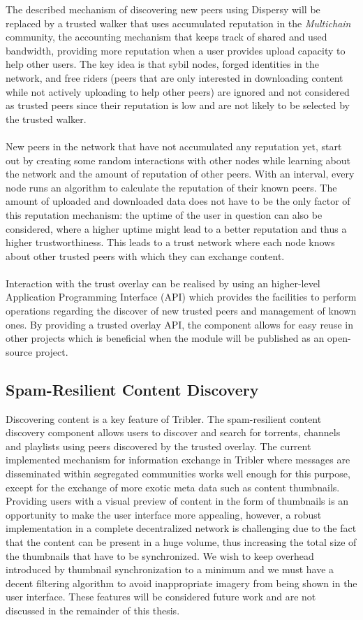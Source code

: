 The described mechanism of discovering new peers using Dispersy will be replaced by a trusted walker that uses accumulated reputation in the \emph{Multichain} community, the accounting mechanism that keeps track of shared and used bandwidth, providing more reputation when a user provides upload capacity to help other users. The key idea is that sybil nodes, forged identities in the network, and free riders (peers that are only interested in downloading content while not actively uploading to help other peers) are ignored and not considered as trusted peers since their reputation is low and are not likely to be selected by the trusted walker.\\\\
New peers in the network that have not accumulated any reputation yet, start out by creating some random interactions with other nodes while learning about the network and the amount of reputation of other peers. With an interval, every node runs an algorithm to calculate the reputation of their known peers. The amount of uploaded and downloaded data does not have to be the only factor of this reputation mechanism: the uptime of the user in question can also be considered, where a higher uptime might lead to a better reputation and thus a higher trustworthiness. This leads to a trust network where each node knows about other trusted peers with which they can exchange content.\\\\
Interaction with the trust overlay can be realised by using an higher-level Application Programming Interface (API) which provides the facilities to perform operations regarding the discover of new trusted peers and management of known ones. By providing a trusted overlay API, the component allows for easy reuse in other projects which is beneficial when the module will be published as an open-source project.

\subsection{Spam-Resilient Content Discovery}
Discovering content is a key feature of Tribler. The spam-resilient content discovery component allows users to discover and search for torrents, channels and playlists using peers discovered by the trusted overlay. The current implemented mechanism for information exchange in Tribler where messages are disseminated within segregated communities works well enough for this purpose, except for the exchange of more exotic  meta data such as content thumbnails. Providing users with a visual preview of content in the form of thumbnails is an opportunity to make the user interface more appealing, however, a robust implementation in a complete decentralized network is challenging due to the fact that the content can be present in a huge volume, thus increasing the total size of the thumbnails that have to be synchronized. We wish to keep overhead introduced by thumbnail synchronization to a minimum and we must have a decent filtering algorithm to avoid inappropriate imagery from being shown in the user interface. These features will be considered future work and are not discussed in the remainder of this thesis.


